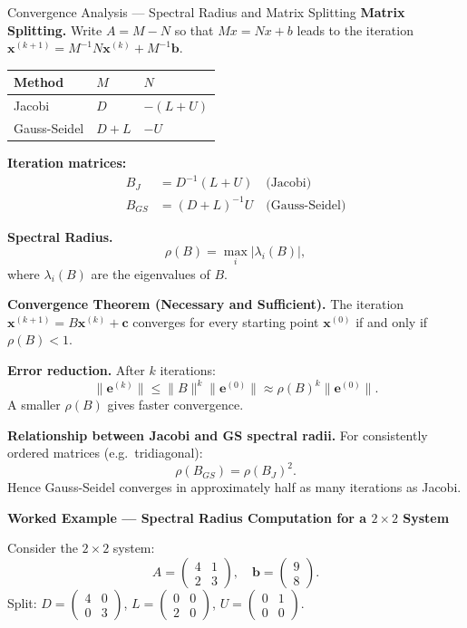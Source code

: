 \documentclass[12pt,a4paper]{article}
\begin{document}
\begin{infobox}{Convergence Analysis --- Spectral Radius and Matrix Splitting}
\textbf{Matrix Splitting.} Write \(A = M - N\) so that \(Mx = Nx + b\) leads to
the iteration \(\mathbf{x}^{(k+1)} = M^{-1}N\mathbf{x}^{(k)} + M^{-1}\mathbf{b}\).

\begin{center}
\begin{tabular}{@{}lll@{}}
\toprule
Method & \(M\) & \(N\) \\
\midrule
Jacobi & \(D\) & \(-(L+U)\) \\
Gauss-Seidel & \(D+L\) & \(-U\) \\
\bottomrule
\end{tabular}
\end{center}

\textbf{Iteration matrices:}
\begin{align*}
B_J &= D^{-1}(L+U) \quad\text{(Jacobi)} \\
B_{GS} &= (D+L)^{-1}U \quad\text{(Gauss-Seidel)}
\end{align*}

\textbf{Spectral Radius.}
\[
  \rho(B) = \max_{i}|\lambda_i(B)|,
\]
where \(\lambda_i(B)\) are the eigenvalues of \(B\).

\textbf{Convergence Theorem (Necessary and Sufficient).}
The iteration \(\mathbf{x}^{(k+1)} = B\mathbf{x}^{(k)} + \mathbf{c}\) converges
for every starting point \(\mathbf{x}^{(0)}\) if and only if \(\rho(B) < 1\).

\textbf{Error reduction.} After \(k\) iterations:
\[
  \|\mathbf{e}^{(k)}\| \leq \|B\|^k \|\mathbf{e}^{(0)}\| \approx \rho(B)^k \|\mathbf{e}^{(0)}\|.
\]
A smaller \(\rho(B)\) gives faster convergence.

\textbf{Relationship between Jacobi and GS spectral radii.}
For consistently ordered matrices (e.g.\ tridiagonal):
\[
  \rho(B_{GS}) = \rho(B_J)^2.
\]
Hence Gauss-Seidel converges in approximately half as many iterations as Jacobi.
\end{infobox}

\textbf{Worked Example --- Spectral Radius Computation for a \(2 \times 2\) System}

Consider the \(2 \times 2\) system:
\[
A = \begin{pmatrix} 4 & 1 \\ 2 & 3 \end{pmatrix}, \quad
\mathbf{b} = \begin{pmatrix} 9 \\ 8 \end{pmatrix}.
\]
Split: \(D = \begin{pmatrix} 4 & 0 \\ 0 & 3 \end{pmatrix}\),
\(L = \begin{pmatrix} 0 & 0 \\ 2 & 0 \end{pmatrix}\),
\(U = \begin{pmatrix} 0 & 1 \\ 0 & 0 \end{pmatrix}\).
\end{document}
